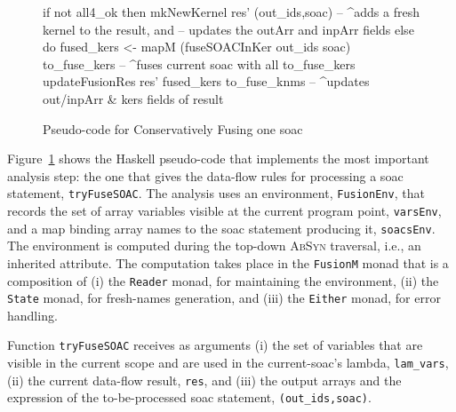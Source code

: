 \documentclass{sigplanconf}  %
\newcommand{\emp}[1]{\textcolor{DikuRed}{ #1}}
\newcommand{\emphh}[1]{\textcolor{CosGreen}{ #1}}
\begin{document}
\begin{figure}[bt]
{\begin{colorcode}
  if not all4_ok then mkNewKernel res' (out_ids,soac)
             -- ^adds a fresh kernel to the result, and    
             -- updates the outArr and inpArr fields
  else do fused_kers <- mapM (fuseSOACInKer out_ids soac) 
                             to_fuse_kers
          -- ^fuses current soac with all to_fuse_kers
          updateFusionRes res' fused_kers to_fuse_knms
          -- ^updates out/inpArr \& kers fields of result
\end{colorcode}
} \vspace{-2ex}
\caption{ Pseudo-code for Conservatively Fusing one {\sc soac} }
\label{fig:FuseOnce}
\end{figure}


Figure~\ref{fig:FuseOnce} shows %
the Haskell pseudo-code that implements the most important 
analysis step: the one that gives the data-flow rules for processing 
a {\sc soac} statement, \emp{\tt tryFuseSOAC}. 
%
The analysis uses an environment, \emphh{\tt FusionEnv}, that records the set 
of array variables visible at the current program point, {\tt varsEnv}, and a 
map binding array names to the {\sc soac} statement producing it, {\tt soacsEnv}. 
The environment is computed during the top-down \textsc{AbSyn} traversal, 
i.e., an inherited attribute.
%
The computation takes place in the \emp{\tt FusionM} monad that is a
composition of (i) the {\tt Reader} monad, for maintaining the environment,
(ii) the {\tt State} monad, for fresh-names generation, and (iii) the 
{\tt Either} monad, for error handling.

Function \emp{\tt tryFuseSOAC} receives as arguments (i) the set of variables
that are visible in the current scope and are used in the current-{\sc soac}'s
lambda, {\tt lam\_vars}, (ii) the current data-flow result, {\tt res}, and
(iii) the output arrays and the expression of the to-be-processed 
{\sc soac} statement, {\tt (out\_ids,soac)}.  
\end{document}
